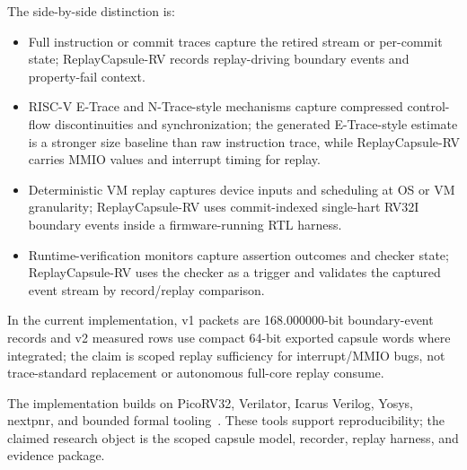 The side-by-side distinction is:
\begin{itemize}
\item Full instruction or commit traces capture the retired stream or per-commit state; ReplayCapsule-RV records replay-driving boundary events and property-fail context.
\item RISC-V E-Trace and N-Trace-style mechanisms capture compressed control-flow discontinuities and synchronization; the generated E-Trace-style estimate is a stronger size baseline than raw instruction trace, while ReplayCapsule-RV carries MMIO values and interrupt timing for replay.
\item Deterministic VM replay captures device inputs and scheduling at OS or VM granularity; ReplayCapsule-RV uses commit-indexed single-hart RV32I boundary events inside a firmware-running RTL harness.
\item Runtime-verification monitors capture assertion outcomes and checker state; ReplayCapsule-RV uses the checker as a trigger and validates the captured event stream by record/replay comparison.
\end{itemize}
In the current implementation, v1 packets are 168.000000-bit boundary-event records and v2 measured rows use compact 64-bit exported capsule words where integrated; the claim is scoped replay sufficiency for interrupt/MMIO bugs, not trace-standard replacement or autonomous full-core replay consume.

The implementation builds on PicoRV32, Verilator, Icarus Verilog, Yosys, nextpnr, and bounded formal tooling~\cite{picorv32,verilator,icarus,yosys,nextpnr,symbiyosys}. These tools support reproducibility; the claimed research object is the scoped capsule model, recorder, replay harness, and evidence package.

